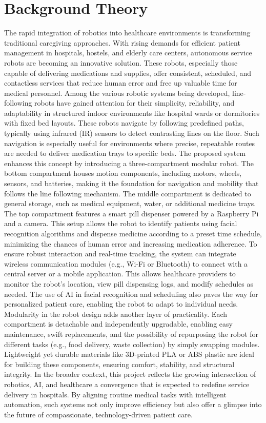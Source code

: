 \section{Background Theory}
The rapid integration of robotics into healthcare environments is transforming traditional caregiving approaches. With rising demands for efficient patient management in hospitals, hostels, and elderly care centers, autonomous service robots are becoming an innovative solution. These robots, especially those capable of delivering medications and supplies, offer consistent, scheduled, and contactless services that reduce human error and free up valuable time for medical personnel.
Among the various robotic systems being developed, line-following robots have gained attention for their simplicity, reliability, and adaptability in structured indoor environments like hospital wards or dormitories with fixed bed layouts. These robots navigate by following predefined paths, typically using infrared (IR) sensors to detect contrasting lines on the floor. Such navigation is especially useful for environments where precise, repeatable routes are needed to deliver medication trays to specific beds.
The proposed system enhances this concept by introducing a three-compartment modular robot. The bottom compartment houses motion components, including motors, wheels, sensors, and batteries, making it the foundation for navigation and mobility that follows the line following mechanism. The middle compartment is dedicated to general storage, such as medical equipment, water, or additional medicine trays. The top compartment features a smart pill dispenser powered by a Raspberry Pi and a camera. This setup allows the robot to identify patients using facial recognition algorithms and dispense medicine according to a preset time schedule, minimizing the chances of human error and increasing medication adherence.
To ensure robust interaction and real-time tracking, the system can integrate wireless communication modules (e.g., Wi-Fi or Bluetooth) to connect with a central server or a mobile application. This allows healthcare providers to monitor the robot’s location, view pill dispensing logs, and modify schedules as needed. The use of AI in facial recognition and scheduling also paves the way for personalized patient care, enabling the robot to adapt to individual needs.
Modularity in the robot design adds another layer of practicality. Each compartment is detachable and independently upgradable, enabling easy maintenance, swift replacements, and the possibility of repurposing the robot for different tasks (e.g., food delivery, waste collection) by simply swapping modules. Lightweight yet durable materials like 3D-printed PLA or ABS plastic are ideal for building these components, ensuring comfort, stability, and structural integrity.
In the broader context, this project reflects the growing intersection of robotics, AI, and healthcare a convergence that is expected to redefine service delivery in hospitals. By aligning routine medical tasks with intelligent automation, such systems not only improve efficiency but also offer a glimpse into the future of compassionate, technology-driven patient care.



